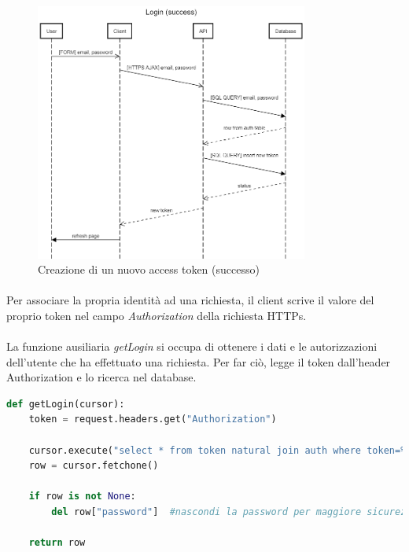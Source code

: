 \documentclass[11pt,a4paper,english]{article}
\begin{document}
\begin{figure}[H]
    \centering
    \includegraphics[width=0.8\textwidth]{img/Login (success).png}
    \caption{Creazione di un nuovo access token (successo)}
\end{figure}

\paragraph{} Per associare la propria identità ad una richiesta, il client scrive il valore del proprio token nel campo \emph{Authorization} della richiesta HTTPs. 

\paragraph{} La funzione ausiliaria \emph{getLogin} si occupa di ottenere i dati e le autorizzazioni dell'utente che ha effettuato una richiesta. Per far ciò, legge il token dall'header Authorization e lo ricerca nel database.


\begin{lstlisting}[language=Python, caption=funzione ausiliaria getLogin]
def getLogin(cursor):
    token = request.headers.get("Authorization")

    cursor.execute("select * from token natural join auth where token=%s", (token, ))
    row = cursor.fetchone()

    if row is not None:
        del row["password"]  #nascondi la password per maggiore sicurezza
 
    return row
\end{lstlisting}
\end{document}

